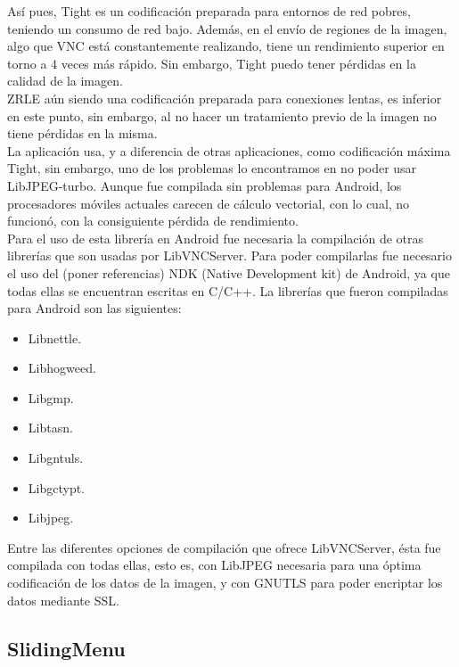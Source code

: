 Así pues, Tight es un codificación preparada para entornos de red pobres, teniendo un consumo de red bajo. Además, en el envío de regiones de la imagen, algo que VNC está constantemente realizando, tiene un rendimiento superior en torno a 4 veces más rápido. Sin embargo, Tight puedo tener pérdidas en la calidad de la imagen.\\

ZRLE aún siendo una codificación preparada para conexiones lentas, es inferior en este punto, sin embargo, al no hacer un tratamiento previo de la imagen no tiene pérdidas en la misma.\\

La aplicación usa, y a diferencia de otras aplicaciones, como codificación máxima Tight, sin embargo, uno de los problemas lo encontramos en no poder usar LibJPEG-turbo. Aunque fue compilada sin problemas para Android, los procesadores móviles actuales carecen de cálculo vectorial, con lo cual, no funcionó, con la consiguiente pérdida de rendimiento.\\

Para el uso de esta librería en Android fue necesaria la compilación de otras librerías que son usadas por LibVNCServer. Para poder compilarlas fue necesario el uso del (poner referencias) NDK (Native Development kit) de Android, ya que todas ellas se encuentran escritas en C/C++. La librerías que fueron compiladas para Android son las siguientes:\\
\begin{itemize}
\item Libnettle.
\item Libhogweed.
\item Libgmp.
\item Libtasn.
\item Libgntuls.
\item Libgctypt.
\item Libjpeg.\\
\end{itemize}

Entre las diferentes opciones de compilación que ofrece LibVNCServer, ésta fue compilada con todas ellas, esto es, con LibJPEG necesaria para una óptima codificación de los datos de la imagen, y con GNUTLS para poder encriptar los datos mediante SSL.

\subsection{SlidingMenu}

